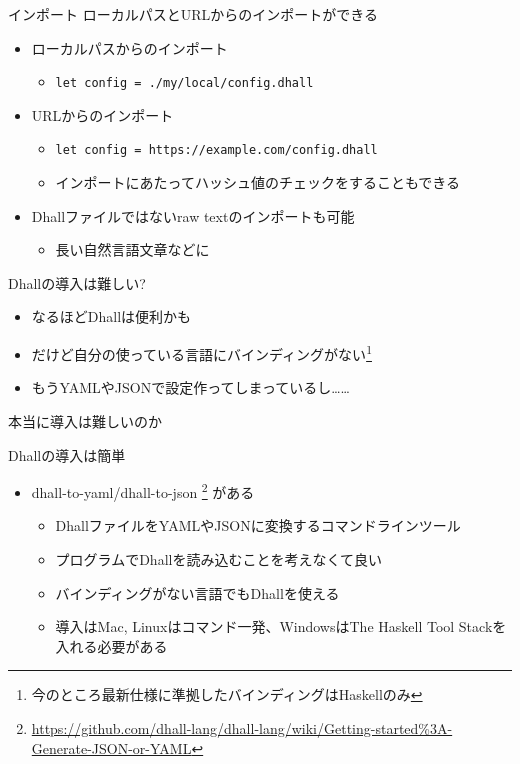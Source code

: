 \documentclass[unicode,12pt]{beamer}
\begin{document}
\begin{frame}{インポート}
  ローカルパスとURLからのインポートができる
  \begin{itemize}
  \item ローカルパスからのインポート
    \begin{itemize}
    \item \texttt{let config = ./my/local/config.dhall}
    \end{itemize}
  \item URLからのインポート
    \begin{itemize}
    \item \texttt{let config = https://example.com/config.dhall}
    \item インポートにあたってハッシュ値のチェックをすることもできる
    \end{itemize}
  \item Dhallファイルではないraw textのインポートも可能
    \begin{itemize}
    \item 長い自然言語文章などに
    \end{itemize}
  \end{itemize}
\end{frame}

\begin{frame}{Dhallの導入は難しい?}
  \begin{itemize}
  \item なるほどDhallは便利かも
  \item だけど自分の使っている言語にバインディングがない\footnote{今のところ最新仕様に準拠したバインディングはHaskellのみ}
  \item もうYAMLやJSONで設定作ってしまっているし……
  \end{itemize}

  本当に導入は難しいのか
\end{frame}

\begin{frame}{Dhallの導入は簡単}
  \begin{itemize}
  \item \alert{dhall-to-yaml/dhall-to-json}
    \footnote{\url{https://github.com/dhall-lang/dhall-lang/wiki/Getting-started\%3A-Generate-JSON-or-YAML}}
    がある
    \begin{itemize}
      \item DhallファイルをYAMLやJSONに変換するコマンドラインツール
      \item プログラムでDhallを読み込むことを考えなくて良い
      \item バインディングがない言語でもDhallを使える
      \item 導入はMac, Linuxはコマンド一発、WindowsはThe Haskell Tool Stackを入れる必要がある
    \end{itemize}
  \end{itemize}
\end{frame}
\end{document}
